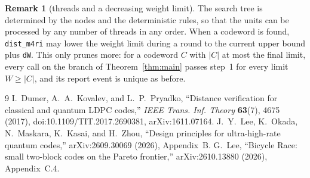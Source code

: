 \documentclass[11pt]{article}
\theoremstyle{definition}
\newtheorem{remark}[theorem]{Remark}
\newcommand{\ttt}[1]{\texttt{#1}}
\begin{document}
\begin{remark}[threads and a decreasing weight limit]\label{rem:threads}
The search tree is determined by the nodes and the deterministic rules, so that the units can be processed by any
number of threads in any order. When a codeword is found, \ttt{dist\_m4ri} may lower the weight limit during a round
to the current upper bound plus \ttt{dW}. This only prunes more: for a codeword $C$ with $|C|$ at most the final limit,
every call on the branch of Theorem~\ref{thm:main} passes step~1 for every limit $W\ge|C|$, and its report event is
unique as before.
\end{remark}

\begin{thebibliography}{9}
I.~Dumer, A.~A.~Kovalev, and L.~P.~Pryadko, ``Distance verification for classical and quantum LDPC codes,''
\emph{IEEE Trans. Inf. Theory} \textbf{63}(7), 4675 (2017), doi:10.1109/TIT.2017.2690381, arXiv:1611.07164.
J.~Y.~Lee, K.~Okada, N.~Maskara, K.~Kasai, and H.~Zhou, ``Design principles for ultra-high-rate quantum codes,''
arXiv:2609.30069 (2026), Appendix~B.
G.~Lee, ``Bicycle Race: small two-block codes on the Pareto frontier,'' arXiv:2610.13880 (2026), Appendix~C.4.
\end{thebibliography}
\end{document}
